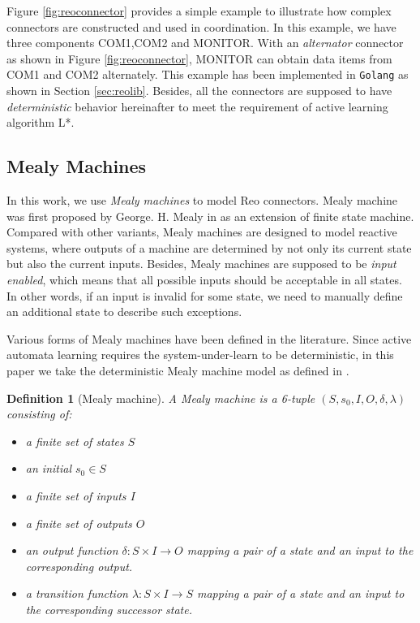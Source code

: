 \documentclass[conference, a4paper]{IEEEtran}
\newtheorem{definition}{Definition}
\begin{document}
Figure \ref{fig:reoconnector} provides a simple example to illustrate how complex
connectors are constructed and used in coordination. In this example, we have three components
COM1,COM2 and MONITOR. With an \emph{alternator} connector as shown in Figure
\ref{fig:reoconnector}, MONITOR can obtain data items from COM1 and COM2 alternately. This example
has been implemented in \texttt{Golang} as shown in Section \ref{sec:reolib}.
Besides, all the connectors are supposed to have \emph{deterministic} behavior hereinafter to meet
the requirement of active learning algorithm L*.


\subsection{Mealy Machines} 

In this work, we use \emph{Mealy machines} to model Reo connectors.
Mealy machine was first proposed by George. H. Mealy in \cite{George1955A} as an extension of finite
state machine. Compared with other variants, Mealy machines are designed to model
reactive systems, where outputs of a machine are determined by not only its current state but also
the current inputs. Besides, Mealy machines are supposed to be \emph{input enabled}, which means
that all possible inputs should be acceptable in all states. In other words, if an input is invalid
for some state, we need to manually define an additional state to describe such exceptions.

Various forms of Mealy machines have been defined in the literature. 
Since active automata learning requires the system-under-learn to be deterministic, in
this paper we take the deterministic Mealy machine model as defined in 
\cite{DBLP:conf/sfm/SteffenHM11}. 

\begin{definition}[Mealy machine]
  A Mealy machine is a 6-tuple $(S, s_0, I, O, \delta, \lambda)$ consisting of:
  \begin{itemize}
    \item[-] a finite set of states $S$
    \item[-] an initial $s_0\in S$
    \item[-] a finite set of inputs $I$
    \item[-] a finite set of outputs $O$
    \item[-] an output function $\delta : S \times  I \rightarrow O$ mapping a pair
      of a state and an input to the corresponding output.
    \item[-] a transition function $\lambda : S \times I \rightarrow S$ mapping a pair of a
      state and an input to the corresponding successor state.
  \end{itemize}
\end{definition}
\end{document}
